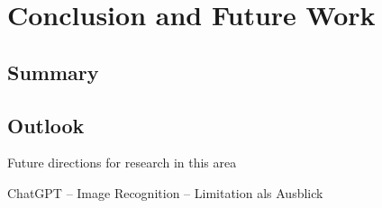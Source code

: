 \chapter{Conclusion and Future Work}
\label{sec:zusfas}

\section*{Summary}
\section*{Outlook}

Future directions for research in this area

ChatGPT – Image Recognition – Limitation als Ausblick